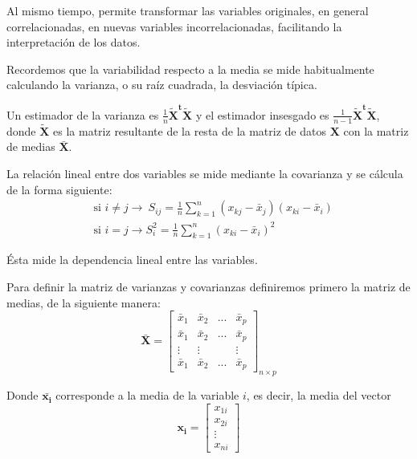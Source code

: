 \documentclass[12pt,letterpaper]{report} %
\begin{document}
Al mismo tiempo, permite transformar las variables originales, en general correlacionadas, en nuevas variables incorrelacionadas, facilitando la interpretación de los datos.

Recordemos que la variabilidad respecto a la media se mide habitualmente calculando la varianza, o su raíz cuadrada, la desviación típica. 

Un estimador de la varianza es $\frac{1}{n}\mathbf{\tilde{X}^t\tilde{X}}$ y el estimador insesgado es $\frac{1}{n-1}\mathbf{\tilde{X}^t\tilde{X}}$, donde $\mathbf{\tilde{X}}$ es la matriz resultante de la resta de la matriz de datos $\mathbf{X}$ con la matriz de medias $\bar{\mathbf{X}}$.

La relación lineal entre dos variables se mide mediante la covarianza y se cálcula de la forma siguiente:
$$
\begin{array}{rl}
& \mbox{si }i\ne j  \to \ S_{ij} = \frac{1}{n}\sum_{k=1}^{n}(x_{kj}-\bar x_{j})(x_{ki}-\bar x_{i}) \\
& \mbox{si }i=j \to S_{i}^2 = \frac{1}{n}\sum_{k=1}^{n}(x_{ki}-\bar x_{i})^2
\end{array}
$$

Ésta mide la dependencia lineal entre las variables.

Para definir la matriz de varianzas y covarianzas definiremos primero la matriz de medias, de la siguiente manera:
$$
\bar{\mathbf{X}}=\begin{bmatrix}
\bar{x}_{1} & \bar{x}_{2} & ... & \bar{x}_{p} \\
\bar{x}_{1} & \bar{x}_{2} & ... & \bar{x}_{p} \\
\vdots & \vdots &   & \vdots \\
\bar{x}_{1} & \bar{x}_{2} & ... & \bar{x}_{p}
\end{bmatrix}_{n\times p}
$$

Donde $\bar{\mathbf{x_i}}$ corresponde a la media de la variable $i$, es decir, la media del vector 
$$
\mathbf{x_i}=\begin{bmatrix}
x_{1i}\\
x_{2i}\\
\vdots\\
x_{ni}
\end{bmatrix}
$$
\end{document}
